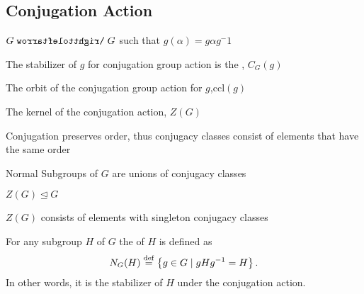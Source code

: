 \documentclass[11pt]{scrartcl}
\def\acts{\mathrel{\reflectbox{$\righttoleftarrow$}}}
\begin{document}
\subsection{Conjugation Action}
\begin{definitions}
$G \acts G$ such that $g(\alpha)=g\alpha g^-1$
\end{definitions}
\begin{definitions}
The stabilizer of $g$ for conjugation group action is the , $C_{G}(g)$
\end{definitions}
\begin{definitions}
The orbit of the conjugation group action for $g$,$\text{ccl}(g)$
\end{definitions}
\begin{definitions}
The kernel of the conjugation action, $Z(G)$
\end{definitions}
\begin{prop}
Conjugation preserves order, thus conjugacy classes consist of elements that have the same order
\end{prop}
\begin{prop}
Normal Subgroups of $G$ are unions of conjugacy classes
\end{prop}
\begin{prop}
$Z(G) \mathrel{\unlhd} G$
\end{prop}
\begin{prop}
$Z(G)$ consists of elements with singleton conjugacy classes
\end{prop}
\begin{definitions}
	For any subgroup $H$ of $G$ the  of $H$ is defined as
	\[ N_G(H) \overset{\mathrm{def}}{=} \left\{ g \in G \mid gHg^{-1} = H \right\}. \]
	In other words, it is the stabilizer of $H$ under the conjugation action.
\end{definitions}
\end{document}
